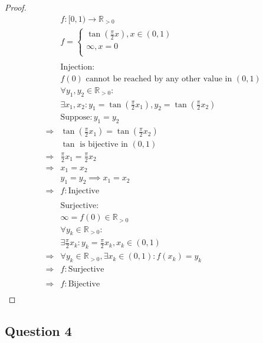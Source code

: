 \documentclass{article}
\begin{document}
\begin{proof}
    \begin{align*}
        &f:[0,1)\rightarrow\mathbb{R}_{>0}\\
        &f=\begin{cases}
            \tan(\frac{\pi}{2}x),x\in(0,1)\\
            \infty,x=0\\
        \end{cases}\\
        &\\
        &\text{Injection}:\\
        &f(0)\text{ cannot be reached by any other value in }(0,1)\\
        &\forall y_1,y_2\in \mathbb{R}_{>0}:\\
        &\exists x_1,x_2:y_1=\tan(\frac{\pi}{2}x_1),y_2=\tan(\frac{\pi}{2}x_2)\\
        &\text{Suppose}: y_1=y_2\\
        \Rightarrow&\tan(\frac{\pi}{2}x_1)=\tan(\frac{\pi}{2}x_2)\\
        &\tan\text{ is bijective in }(0,1)\\
        \Rightarrow&\frac{\pi}{2}x_1=\frac{\pi}{2}x_2\\
        \Rightarrow&x_1=x_2\\
        &y_1=y_2\implies x_1=x_2\\
        \Rightarrow&f:\text{Injective}\\
        &\\
        &\text{Surjective}:\\
        &\infty=f(0)\in\mathbb{R}_{>0}\\
        &\forall y_k\in \mathbb{R}_{>0}:\\
        &\exists \frac{\pi}{2}x_k:y_k=\frac{\pi}{2}x_k,x_k\in(0,1)\\
        \Rightarrow&\forall y_k\in \mathbb{R}_{>0},\exists x_k\in (0,1):f(x_k)=y_k\\
        \Rightarrow&f:\text{Surjective}\\
        &\\
        \Rightarrow&f:\text{Bijective}\\
    \end{align*}
\end{proof}

\newpage

\subsection*{Question 4}
\end{document}
